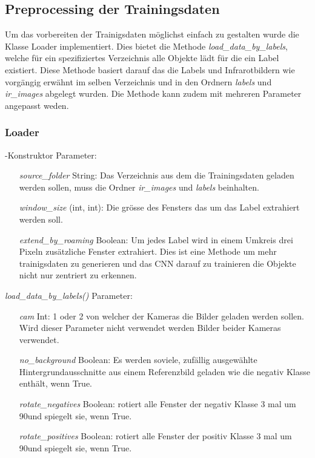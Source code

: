 \subsection{Preprocessing der Trainingsdaten}

Um das vorbereiten der Trainigsdaten möglichst einfach zu gestalten wurde die Klasse Loader implementiert. Dies bietet die Methode \textit{load\_data\_by\_labels}, welche für ein spezifiziertes Verzeichnis alle Objekte lädt für die ein Label existiert. Diese Methode basiert darauf das die Labels und Infrarotbildern wie vorgängig erwähnt im selben Verzeichnis und in den Ordnern \textit{labels} und \textit{ir\_images} abgelegt wurden. Die Methode kann zudem mit mehreren Parameter angepasst weden.

\subsubsection{Loader}

\noindent -Konstruktor Parameter:
\begin{itemize}[leftmargin=*, labelindent=3cm, labelsep=1cm]
	\item[\textit{source\_folder}] String: Das Verzeichnis aus dem die Trainingsdaten geladen werden sollen, muss die Ordner \textit{ir\_images} und \textit{labels} beinhalten.
	\item[\textit{window\_size}] (int, int): Die grösse des Fensters das um das Label extrahiert werden soll.
	\item[\textit{extend\_by\_roaming}] Boolean: Um jedes Label wird in einem Umkreis drei Pixeln zusätzliche Fenster extrahiert. Dies ist eine Methode um mehr trainigsdaten zu generieren und das CNN darauf zu trainieren die Objekte nicht nur zentriert zu erkennen.
\end{itemize}
\vspace{2em}
\noindent\textit{load\_data\_by\_labels()} Parameter:
\begin{itemize}[leftmargin=*,labelindent=3cm, labelsep=1cm]
		\item[\textit{cam}] Int: 1 oder 2 von welcher der Kameras die Bilder geladen werden sollen. Wird dieser Parameter nicht verwendet werden Bilder beider Kameras verwendet.
		\item[\textit{no\_background}] Boolean: Es werden soviele, zufällig ausgewählte Hintergrundausschnitte aus einem Referenzbild geladen wie die negativ Klasse enthält, wenn True.
		\item[\textit{rotate\_negatives}] Boolean: rotiert alle Fenster der negativ Klasse 3 mal um 90\degree und spiegelt sie, wenn True.
		\item[\textit{rotate\_positives}] Boolean: rotiert alle Fenster der positiv Klasse 3 mal um 90\degree und spiegelt sie, wenn True.
\end{itemize}

